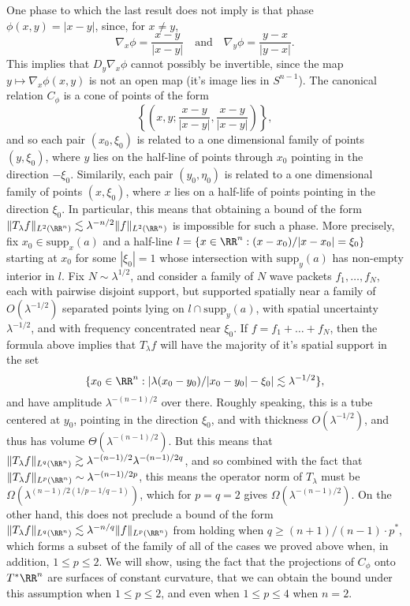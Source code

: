 One phase to which the last result does not imply is that phase $\phi(x,y) = |x - y|$, since, for $x \neq y$,
%
\[ \nabla_x \phi = \frac{x - y}{|x - y|} \quad\text{and}\quad \nabla_y \phi = \frac{y - x}{|y - x|}. \]
%
This implies that $D_y \nabla_x \phi$ cannot possibly be invertible, since the map $y \mapsto \nabla_x \phi(x,y)$ is not an open map (it's image lies in $S^{n-1}$). The canonical relation $C_\phi$ is a cone of points of the form
%
\[ \left\{ \left(x,y; \frac{x - y}{|x - y|}, \frac{x - y}{|x - y|} \right) \right\}, \]
%
and so each pair $(x_0,\xi_0)$ is related to a one dimensional family of points $(y,\xi_0)$, where $y$ lies on the half-line of points through $x_0$ pointing in the direction $-\xi_0$. Similarily, each pair $(y_0,\eta_0)$ is related to a one dimensional family of points $(x,\xi_0)$, where $x$ lies on a half-life of points pointing in the direction $\xi_0$. In particular, this means that obtaining a bound of the form $\| T_\lambda f \|_{L^2(\RR^n)} \lesssim \lambda^{-n/2} \| f \|_{L^2(\RR^n)}$ is impossible for such a phase. More precisely, fix $x_0 \in \text{supp}_x(a)$ and a half-line $l = \{ x \in \RR^n : (x - x_0) / |x - x_0| = \xi_0 \}$ starting at $x_0$ for some $|\xi_0| = 1$ whose intersection with $\text{supp}_y(a)$ has non-empty interior in $l$. Fix $N \sim \lambda^{1/2}$, and consider a family of $N$ wave packets $f_1, \dots, f_N$, each with pairwise disjoint support, but supported spatially near a family of $O(\lambda^{-1/2})$ separated points lying on $l \cap \text{supp}_y(a)$, with spatial uncertainty $\lambda^{-1/2}$, and with frequency concentrated near $\xi_0$. If $f = f_1 + \dots + f_N$, then the formula above implies that $T_\lambda f$ will have the majority of it's spatial support in the set 
%
\[ \{ x_0 \in \RR^n : |\lambda (x_0 - y_0)/|x_0 - y_0| - \xi_0| \lesssim \lambda^{-1/2} \}, \]
%
and have amplitude $\lambda^{-(n-1)/2}$ over there. Roughly speaking, this is a tube centered at $y_0$, pointing in the direction $\xi_0$, and with thickness $O(\lambda^{-1/2})$, and thus has volume $\Theta(\lambda^{-(n-1)/2})$. But this means that $\| T_\lambda f \|_{L^q(\RR^n)} \gtrsim \lambda^{-(n-1)/2} \lambda^{-(n-1)/2q}$, and so combined with the fact that $\| T_\lambda f \|_{L^p(\RR^n)} \sim \lambda^{-(n-1)/2p}$, this means the operator norm of $T_\lambda$ must be $\Omega(\lambda^{(n-1)/2 (1/p - 1/q - 1)})$, which for $p = q = 2$ gives $\Omega(\lambda^{-(n-1)/2})$. On the other hand, this does not preclude a bound of the form $\| T_\lambda f \|_{L^q(\RR^n)} \lesssim \lambda^{-n/q} \| f \|_{L^p(\RR^n)}$ from holding when $q \geq (n+1)/(n-1) \cdot p^*$, which forms a subset of the family of all of the cases we proved above when, in addition, $1 \leq p \leq 2$. We will show, using the fact that the projections of $C_\phi$ onto $T^* \RR^n$ are surfaces of constant curvature, that we can obtain the bound under this assumption when $1 \leq p \leq 2$, and even when $1 \leq p \leq 4$ when $n = 2$.

